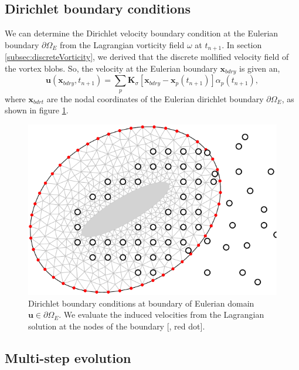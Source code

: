 \subsection{Dirichlet boundary conditions}
\label{subsec:dbc}
We can determine the Dirichlet velocity boundary condition at the Eulerian boundary $\partial \Omega_E$ from the Lagrangian vorticity field $\omega$ at $t_{n+1}$. In section \ref{subsec:discreteVorticity}, we derived that the discrete mollified velocity field of the vortex blobs. So, the velocity at the Eulerian boundary $\mathbf{x}_{bdry}$ is given an,
\begin{equation}
\mathbf{u}(\mathbf{x}_{bdry},t_{n+1}) = \sum_p \mathbf{K}_{\sigma}[\mathbf{x}_{bdry} - \mathbf{x}_p(t_{n+1})]\alpha_p(t_{n+1}),
\end{equation}
where $\mathbf{x}_{bdrt}$ are the nodal coordinates of the Eulerian dirichlet boundary $\partial \Omega_E$, as shown in figure \ref{fig:eulerianDirichletBC}.

	\begin{figure}[!t]
	\centering
	\includegraphics[width=0.5\linewidth]{./figures/hybrid/interpolation/ellipse/eulerianDirichletBC-crop.pdf}
	\caption{Dirichlet boundary conditions at boundary of Eulerian domain $\mathbf{u} \in \partial \Omega_E$. We evaluate the induced velocities from the Lagrangian solution at the nodes of the boundary  [{\color{plotRed}{$\bullet$}}, red dot].}
	\label{fig:eulerianDirichletBC}
	\end{figure}	


\subsection{Multi-step evolution}
\label{subsec:mse}

